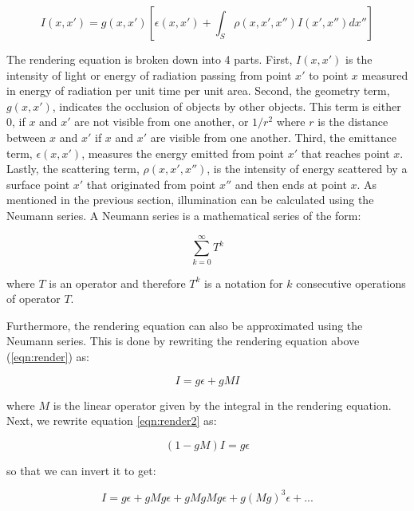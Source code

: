 \begin{equation}
I(x,x') = g(x,x')[\epsilon(x,x')+\int_{S} \rho(x,x',x'')I(x',x'')dx''] \label{eqn:render}
\end{equation}

The rendering equation is broken down into 4 parts.  First, $I(x,x')$ is the intensity of light or energy of radiation passing from point $x'$ to point $x$ measured in energy of radiation per unit time per unit area.  Second, the geometry term, $g(x,x')$, indicates the occlusion of objects by other objects.  This term is either $0$, if $x$ and $x'$ are not visible from one another, or $1/r^2$ where $r$ is the distance between $x$ and $x'$ if $x$ and $x'$ are visible from one another.  Third, the emittance term, $\epsilon(x,x')$, measures the energy emitted from point $x'$ that reaches point $x$.  Lastly, the scattering term, $\rho(x,x',x'')$, is the intensity of energy scattered by a surface point $x'$ that originated from point $x''$ and then ends at point $x$.  As mentioned in the previous section, illumination can be calculated using the Neumann series.  A Neumann series is a mathematical series of the form:

\begin{equation}
\sum_{k=0}^{\infty}T^k \label{eqn:neumann}
\end{equation}

where $T$ is an operator and therefore $T^k$ is a notation for $k$ consecutive operations of operator $T$. 

Furthermore, the rendering equation can also be approximated using the Neumann series.  This is done by rewriting the rendering equation above (\ref{eqn:render}) as:

\begin{equation}
I = g\epsilon +gMI \label{eqn:render2}
\end{equation}

where $M$ is the linear operator given by the integral in the rendering equation.  Next, we rewrite equation \ref{eqn:render2} as:

\begin{equation}
(1-gM)I = g\epsilon \label{eqn:render3}
\end{equation}

so that we can invert it to get:

\begin{equation}
I = g\epsilon + gMg\epsilon + gMgMg\epsilon +g(Mg)^3\epsilon + ... \label{eqn:render4}
\end{equation}


